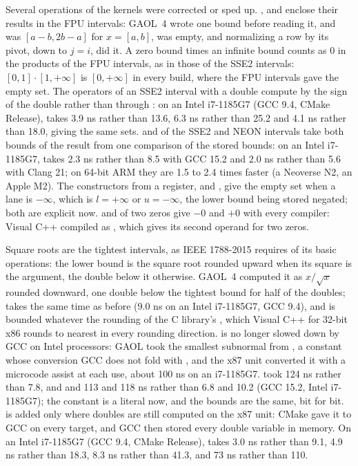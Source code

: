 \medskip
Several operations of the kernels were corrected or sped up.\newinvfive{}
,  and  enclose their results in the
FPU intervals: GAOL~4 wrote one bound before reading it, and 
was $[a - b, 2b - a]$ for $x = [a, b]$, \code{[0.1] /= [0.1]} was empty, and
normalizing a row by its pivot,  down to $j = i$, did
it. A zero bound times an infinite bound counts as 0 in the products of the
FPU intervals, as in those of the SSE2 intervals: $[0, 1] \cdot [1, +\infty]$
is $[0, +\infty]$ in every build, where the FPU intervals gave the empty set.
The operators of an SSE2 interval with a double compute by the sign of the
double rather than through : on an Intel i7-1185G7 (GCC
9.4, CMake Release),  takes 3.9 ns rather than 13.6,
 6.3 ns rather than 25.2 and  4.1 ns rather than
18.0, giving the same sets.  and  of the SSE2
and NEON intervals take both bounds of the result from one comparison of the
stored bounds: on an Intel i7-1185G7,  takes 2.3 ns rather
than 8.5 with GCC 15.2 and 2.0 ns rather than 5.6 with Clang 21; on 64-bit
ARM they are 1.5 to 2.4 times faster (a Neoverse N2, an Apple M2). The
constructors from a register,  and
, give the empty set when a lane is
$-\infty$, which is $l = +\infty$ or $u = -\infty$, the lower bound being
stored negated; both are explicit now.
 and  of two zeros give $-0$ and $+0$ with
every compiler: Visual C++ compiled  as ,
which gives its second operand for two zeros.

\medskip
Square roots are the tightest intervals, as IEEE 1788-2015 requires of its
basic operations: the lower bound is the square root rounded upward when its
square is the argument, the double below it otherwise.\newinvfive{} GAOL~4
computed it as $x/\sqrt{x}$ rounded downward, one double below the tightest
bound for half of the doubles;  takes the same time as before
(9.0 ns on an Intel i7-1185G7, GCC 9.4), and is bounded whatever the rounding
of the C library's , which Visual C++ for 32-bit x86 rounds to
nearest in every rounding direction.  is no longer slowed down
by GCC on Intel processors: GAOL took the smallest subnormal from
, a 
constant whose conversion GCC does not fold with ,
and the x87 unit converted it with a microcode assist at each use, about
100 ns on an i7-1185G7.  took 124 ns rather than 7.8, and
 and  113 and 118 ns rather than
6.8 and 10.2 (GCC 15.2, Intel i7-1185G7); the constant is a literal now, and
the bounds are the same, bit for bit.  is added only
where doubles are still computed on the x87 unit: CMake gave it to GCC on
every target, and GCC then stored every double variable in memory. On an
Intel i7-1185G7 (GCC 9.4, CMake Release),  takes 3.0 ns rather
than 9.1,  4.9 ns rather than 18.3,  8.3 ns rather
than 41.3, and  73 ns rather than 110.

